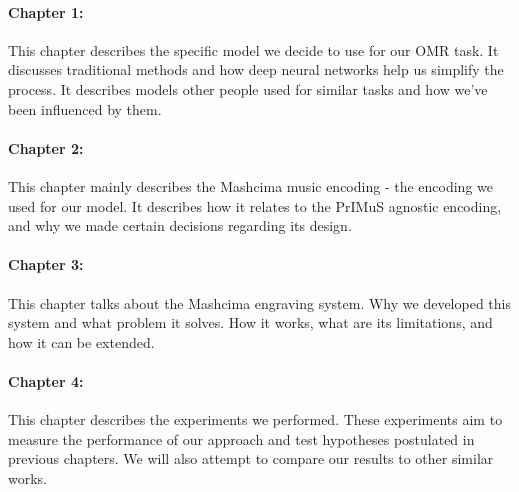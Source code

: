 \paragraph{Chapter 1:} This chapter describes the specific model we decide to use for our OMR task. It discusses traditional methods and how deep neural networks help us simplify the process. It describes models other people used for similar tasks and how we've been influenced by them.

\paragraph{Chapter 2:} This chapter mainly describes the Mashcima music encoding - the encoding we used for our model. It describes how it relates to the PrIMuS agnostic encoding, and why we made certain decisions regarding its design.

\paragraph{Chapter 3:} This chapter talks about the Mashcima engraving system. Why we developed this system and what problem it solves. How it works, what are its limitations, and how it can be extended.

\paragraph{Chapter 4:} This chapter describes the experiments we performed. These experiments aim to measure the performance of our approach and test hypotheses postulated in previous chapters. We will also attempt to compare our results to other similar works.
